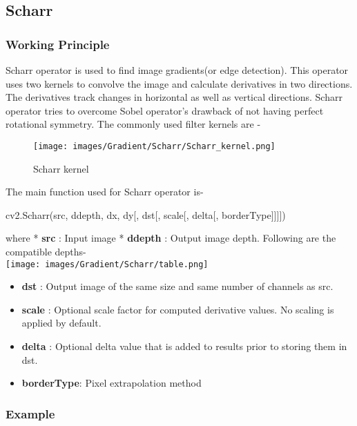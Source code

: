 \documentclass[]{article}
\newenvironment{Shaded}{}{}
\newcommand{\NormalTok}[1]{{#1}}
\providecommand{\tightlist}{%
  \setlength{\itemsep}{0pt}\setlength{\parskip}{0pt}}
\begin{document}
\subsection{Scharr}\label{scharr}

\subsubsection{Working Principle}\label{working-principle}

Scharr operator is used to find image gradients(or edge detection). This
operator uses two kernels to convolve the image and calculate
derivatives in two directions. The derivatives track changes in
horizontal as well as vertical directions. Scharr operator tries to
overcome Sobel operator's drawback of not having perfect rotational
symmetry. The commonly used filter kernels are -

\begin{figure}[htbp]
\centering
\texttt{[image: images/Gradient/Scharr/Scharr\_kernel.png]}
\caption{Scharr kernel}
\end{figure}

The main function used for Scharr operator is-

\begin{Shaded}
\begin{Highlighting}[]
    \NormalTok{cv2.Scharr(src, ddepth, dx, dy[, dst[, scale[, delta[, borderType]]]])}
\end{Highlighting}
\end{Shaded}

where * \textbf{src} : Input image * \textbf{ddepth} : Output image
depth. Following are the compatible depths- \\
\texttt{[image: images/Gradient/Scharr/table.png]}

\begin{itemize}
\tightlist
\item
  \textbf{dst} : Output image of the same size and same number of
  channels as src.
\item
  \textbf{scale} : Optional scale factor for computed derivative values.
  No scaling is applied by default.
\item
  \textbf{delta} : Optional delta value that is added to results prior
  to storing them in dst.
\item
  \textbf{borderType}: Pixel extrapolation method
\end{itemize}

\subsubsection{Example}\label{example}
\end{document}
